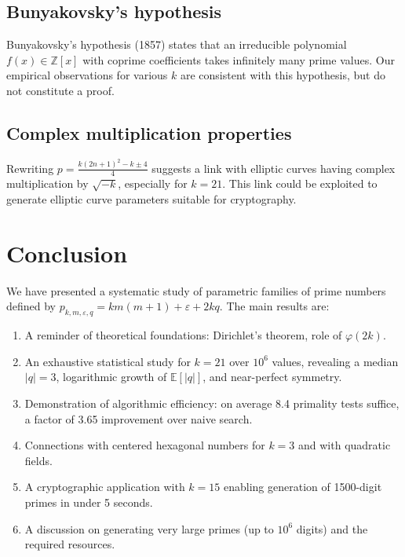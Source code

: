 \documentclass[11pt,a4paper]{article}
\theoremstyle{definition}
\theoremstyle{plain}
\begin{document}
\subsection{Bunyakovsky's hypothesis}

Bunyakovsky's hypothesis (1857) states that an irreducible polynomial $f(x)\in\mathbb Z[x]$ with coprime coefficients takes infinitely many prime values. Our empirical observations for various $k$ are consistent with this hypothesis, but do not constitute a proof.

\subsection{Complex multiplication properties}

Rewriting $p = \frac{k(2n+1)^2 - k \pm 4}{4}$ suggests a link with elliptic curves having complex multiplication by $\sqrt{-k}$, especially for $k=21$. This link could be exploited to generate elliptic curve parameters suitable for cryptography.

\section{Conclusion}

We have presented a systematic study of parametric families of prime numbers defined by $p_{k,m,\varepsilon,q} = km(m+1) + \varepsilon + 2kq$. The main results are:

\begin{enumerate}
    \item A reminder of theoretical foundations: Dirichlet's theorem, role of $\varphi(2k)$.
    \item An exhaustive statistical study for $k=21$ over $10^6$ values, revealing a median $|q|=3$, logarithmic growth of $\mathbb{E}[|q|]$, and near-perfect symmetry.
    \item Demonstration of algorithmic efficiency: on average 8.4 primality tests suffice, a factor of 3.65 improvement over naive search.
    \item Connections with centered hexagonal numbers for $k=3$ and with quadratic fields.
    \item A cryptographic application with $k=15$ enabling generation of 1500-digit primes in under 5 seconds.
    \item A discussion on generating very large primes (up to $10^6$ digits) and the required resources.
\end{enumerate}
\end{document}
